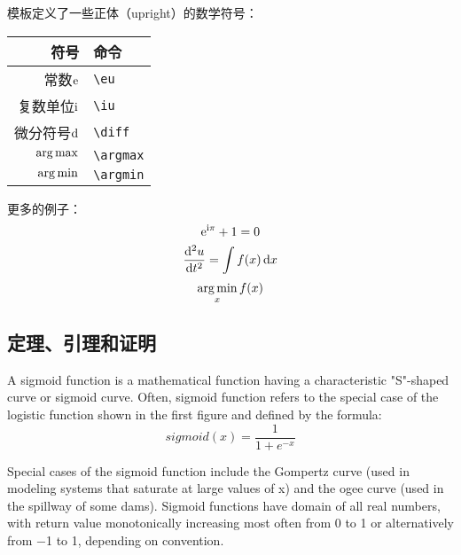 模板定义了一些正体（upright）的数学符号：
\begin{center}
	\begin{tabular}{rl}
		\toprule
		符号                 & 命令 \\
		\midrule
		常数$\mathrm{e}$     & \verb|\eu| \\
		复数单位$\mathrm{i}$ & \verb|\iu| \\
		微分符号$\mathop{}\!\mathrm{d}$ & \verb|\diff| \\
		$\operatorname*{arg\,max}$         & \verb|\argmax| \\
		$\operatorname*{arg\,min}$         & \verb|\argmin| \\
		\bottomrule
	\end{tabular}
\end{center}

更多的例子：
\begin{equation}
\mathrm{e}^{\mathrm{i}\pi} + 1 = 0
\end{equation}
\begin{equation}
\frac{\mathop{}\!\mathrm{d}^2u}{\mathop{}\!\mathrm{d} t^2} = \int f(x) \mathop{}\!\mathrm{d} x
\end{equation}
\begin{equation}
\operatorname*{arg\,min}_x f(x)
\end{equation}

\subsection{定理、引理和证明}

\begin{definition}
	A sigmoid function is a mathematical function having a characteristic "S"-shaped curve or sigmoid curve. Often, sigmoid function refers to the special case of the logistic function shown in the first figure and defined by the formula:
	\begin{equation}
	sigmoid(x) = \frac{1}{1 + e^{-x}}
	\end{equation}
	
	\begin{figure}[htb]
		\centering
	\end{figure}

	Special cases of the sigmoid function include the Gompertz curve (used in modeling systems that saturate at large values of x) and the ogee curve (used in the spillway of some dams). Sigmoid functions have domain of all real numbers, with return value monotonically increasing most often from 0 to 1 or alternatively from −1 to 1, depending on convention.
\end{definition}



